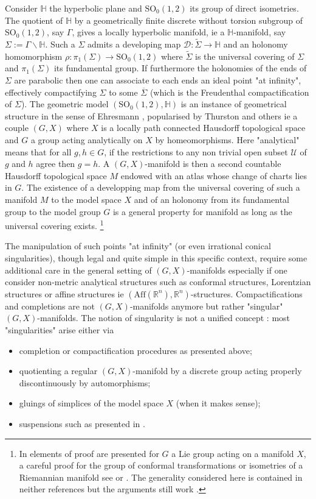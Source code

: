\documentclass[a4paper,12pt]{article}
\def\D{\mathcal{D}}
\def\H{\mathbb{H}}
\def\U{\mathcal U}
\def\GG{\SO_0(1,2)}
\def\D{\mathcal{D}}
\def\SO{\mathrm{SO}}
\def\RR{\mathbb{R}}
\def\SO{\mathrm{SO}}
\def\RR{\mathbb R}
\def\H{\mathbb{H}}
\def\D{\mathcal{D}}
\def\U{\mathcal{U}}
\def\GG{\SO_0(1,2)}
\begin{document}
Consider $\H$ the hyperbolic plane and $\GG$ its group of direct isometries. The quotient of $\H$ by a geometrically finite discrete without torsion subgroup of $\GG$, say $\Gamma$, gives a locally hyperbolic manifold, ie  a $\H$-manifold, say $\Sigma:=\Gamma\backslash\H$. Such  a $\Sigma$ admits a developing map $\D:\widetilde \Sigma\rightarrow \H$ and an holonomy homomorphism
$\rho:\pi_1(\Sigma)\rightarrow \GG$ where $\widetilde \Sigma$ is the universal covering of $\Sigma$ and $\pi_1(\Sigma)$ its fundamental group. If furthermore the holonomies of the ends of $\Sigma$ are parabolic then one can associate to each ends an ideal point "at infinity", effectively compactifying $\Sigma$ to some $\overline \Sigma$ (which is the Freudenthal compactification \cite{MR931673} of $ \Sigma$). The geometric model $(\GG,\H)$ is an instance of geometrical structure in the sense of Ehresmann \cite{MR794193_loc_hom}, popularised by Thurston \cite{thurston-3mani} and others  \cite{MR957518,mess,bonsante_flat_2003,barbot_globally_2004,MR2522946,MR1299730,MR755162} ie a couple $(G,X)$ 
where $X$ is a locally path connected Hausdorff topological space and $G$ a group acting analytically on $X$ by homeomorphisms. Here "analytical" means that for all $g,h\in G$, if the restrictions to any non trivial open subset $\U$  of $g$ and $h$ agree then $g=h$. A $(G,X)$-manifold is then a second countable Hausdorff topological space $M$ endowed with an atlas whose change of charts lies in $G$. The existence of a developping map from the universal covering of such a manifold $M$ to the model space $X$ and of an holonomy from its fundamental group to the model group $G$ is a general property for manifold as long as the universal covering exists. \footnote{In \cite{MR794193_loc_hom} elements of proof are presented for $G$ a Lie group  acting on a manifold $X$, a careful proof for the group  of conformal transformations or isometries of a Riemannian  manifold see \cite{MR0031310} or \cite{MR755162}. The generality considered here is contained in neither references but the arguments still work \cite{thesis}.
}


The manipulation of such points "at infinity" (or even irrational conical singularities), though legal and quite simple in this specific context, require some additional care in the general setting of $(G,X)$-manifolds especially if one consider non-metric analytical structures such as conformal structures, Lorentzian structures or affine structures ie $(\mathrm{Aff}(\RR^n),\RR^n)$-structures. Compactifications and completions are not $(G,X)$-manifolds anymore but rather "singular" $(G,X)$-manifolds. The notion of singularity is not a unified concept : most "singularities" arise either via 
\begin{itemize}
 \item completion or compactification procedures as presented above;
 \item quotienting a regular $(G,X)$-manifold by a discrete group acting properly discontinuously by automorphisms;
 \item gluings of simplices of the model space $X$ (when it makes sense);
 \item suspensions such as presented in \cite{MR1668340,Particules_1}.
\end{itemize}
\end{document}
